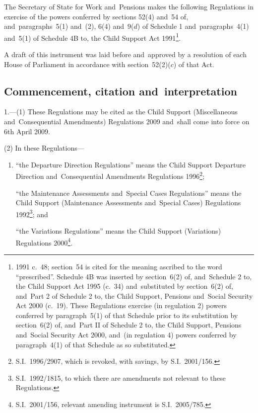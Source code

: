 \documentclass[12pt,a4paper]{article}
\title{\regstitle}
\author{S.I.\ 2009 No.\ 736}
\date{Made
18th March 2009\\
Coming into~force
6th April 2009
}
\begin{document}
\maketitle

\noindent
The Secretary of State for Work and~Pensions makes the following Regulations in exercise of the powers conferred by sections 52(4) and~54 of, and~paragraphs~5(1) and~(2), 6(4) and~9($d$)  of Schedule 1 and~paragraphs~4(1) and~5(1) of Schedule 4B to, the Child Support Act 1991\footnote{1991 c.~48; section~54 is cited for the meaning ascribed to the word “prescribed”. Schedule 4B was inserted by section~6(2) of, and~Schedule 2 to, the Child Support Act 1995 (c.~34) and~substituted by section~6(2) of, and~Part 2 of Schedule 2 to, the Child Support, Pensions and~Social Security Act 2000 (c.~19). These Regulations exercise (in regulation 2) powers conferred by paragraph~5(1) of that Schedule prior to its substitution by section~6(2) of, and~Part II of Schedule 2 to, the Child Support, Pensions and~Social Security Act 2000, and~(in regulation 4) powers conferred by paragraph~4(1) of that Schedule as so substituted.}.

A draft of this instrument was laid before and~approved by a resolution of each House of Parliament in accordance with section~52(2)($c$)  of that Act. 

{\sloppy

\tableofcontents

}

\bigskip

\setcounter{secnumdepth}{-2}

\subsection[1. Commencement, citation and~interpretation]{Commencement, citation and~interpretation}

1.---(1)  These Regulations may be cited as the Child Support (Miscellaneous and~Consequential Amendments) Regulations 2009 and~shall come into force on 6th April 2009.

(2) In these Regulations—
\begin{enumerate}\item[]
“the Departure Direction Regulations” means the Child Support Departure Direction and~Consequential Amendments Regulations 1996\footnote{S.I.~1996/2907, which is revoked, with savings, by S.I.~2001/156.};

“the Maintenance Assessments and~Special Cases Regulations” means the Child Support (Maintenance Assessments and~Special Cases) Regulations 1992\footnote{S.I.~1992/1815, to which there are amendments not relevant to these Regulations.}; and

“the Variations Regulations” means the Child Support (Variations) Regulations 2000\footnote{S.I.~2001/156, relevant amending instrument is S.I.~2005/785.}.
\end{enumerate}
\end{document}
